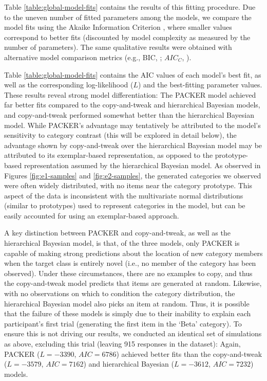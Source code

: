\documentclass[12pt]{article}
\begin{document}
\begin{flushleft}
Table \ref{table:global-model-fits} contains the results of this fitting procedure. Due to the uneven number of fitted parameters among the models, we compare the model fits using the Akaike Information Criterion \citep[AIC;][]{akaike1974new}, where smaller values correspond to better fits (discounted by model complexity as measured by the number of parameters). The same qualitative results were obtained with alternative model comparison metrics (e.g., BIC, \citealp{schwarz1978estimating}; $AIC_C$, \citealp{hurvich1989regression}).

Table \ref{table:global-model-fits} contains the AIC values of each model's best fit, as well as the corresponding log-likelihood ($L$) and the best-fitting parameter values. These results reveal strong model differentiation: The PACKER model achieved far better fits compared to the copy-and-tweak and hierarchical Bayesian models, and copy-and-tweak performed somewhat better than the hierarchical Bayesian model. While PACKER's advantage may tentatively be attributed to the model's sensitivity to category contrast (this will be explored in detail below), the advantage shown by copy-and-tweak over the hierarchical Bayesian model may be attributed to its exemplar-based representation, as opposed to the prototype-based representation assumed by the hierarchical Bayesian model. As observed in Figures \ref{fig:e1-samples} and \ref{fig:e2-samples}, the generated categories we observed were often widely distributed, with no items near the category prototype. This aspect of the data is inconsistent with the multivariate normal distributions (similar to prototypes) used to represent categories in the \cite{jern2013probabilistic} model, but can be easily accounted for using an exemplar-based approach. 

A key distinction between PACKER and copy-and-tweak, as well as the hierarchical Bayesian model, is that, of the three models, only PACKER is capable of making strong predictions about the location of new category members when the target class is entirely novel (i.e., no member of the category has been observed). Under these circumstances, there are no examples to copy, and thus the copy-and-tweak model predicts that items are generated at random. Likewise, with no observations on which to condition the  category distribution, the hierarchical Bayesian model also picks an item at random. Thus, it is possible that the failure of these models is simply due to their inability to explain each participant's first trial (generating the first item in the `Beta' category). To ensure this is not driving our results, we conducted an identical set of simulations as above, excluding this trial (leaving 915 responses in the dataset): Again, PACKER ($L = -3390$, $AIC = 6786$) achieved better fits than the copy-and-tweak ($L = -3579$, $AIC = 7162$) and hierarchical Bayesian ($L=-3612$, $AIC = 7232$) models. 


\end{flushleft}
\end{document}

